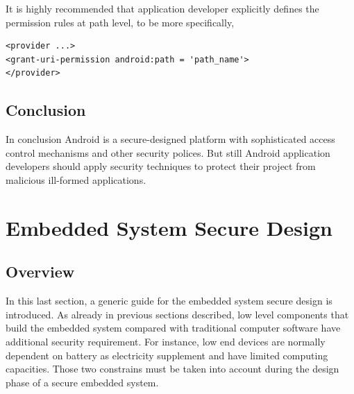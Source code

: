 It is highly recommended that application developer explicitly defines the permission rules at path level, to be more specifically\cite{android_secure_cook}, 
\begin{Verbatim}[fontsize=\relsize{-1},frame=lines,framesep=4mm, label=\fbox{\small\emph{'Content Path Securing}}]
<provider ...>
<grant-uri-permission android:path = 'path_name'>
</provider>
\end{Verbatim} 
\subsection{Conclusion}
In conclusion Android is  a secure-designed platform with sophisticated access control mechanisms and other security polices. But still Android  application developers should apply security techniques to protect their project from malicious ill-formed applications.
\section{Embedded System Secure Design}
\subsection{Overview}
In this last section,  a generic guide for the embedded system secure design is introduced. As already in previous sections described, low level components that build the embedded system compared with traditional  computer software have additional security requirement. For instance, low end devices are normally dependent on battery as electricity supplement and have limited computing capacities. Those two constrains must be taken into account during the design phase of a secure embedded system.
